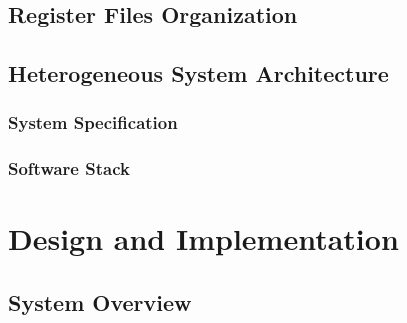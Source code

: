 \documentclass[12pt]{article}
\begin{document}
\begin{CJK}{UTF8}{bkai}
    \subsection{Register Files Organization}
    \subsection{Heterogeneous System Architecture}
        \subsubsection{System Specification}
        \subsubsection{Software Stack}

\section{Design and Implementation}
    \subsection{System Overview}

\end{CJK}
\end{document}
